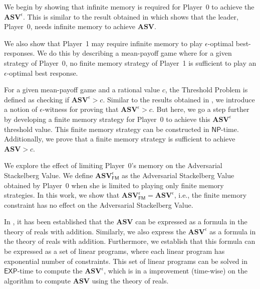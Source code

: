 
We begin by showing that infinite memory is required for Player~0 to achieve the $\mathbf{ASV}^{\epsilon}$. This is similar to the result obtained in \cite{FGR20} which shows that the leader, Player~0, needs infinite memory to achieve $\mathbf{ASV}$. 

We also show that Player~1 may require infinite memory to play $\epsilon$-optimal best-responses. We do this by describing a mean-payoff game where for a given strategy of Player~0, no finite memory strategy of Player~1 is sufficient to play an $\epsilon$-optimal best response.

For a given mean-payoff game and a rational value $c$, the Threshold Problem is defined as checking if $\mathbf{ASV}^{\epsilon} > c$. Similar to the results obtained in \cite{FGR20}, we introduce a notion of $\epsilon$-witness for proving that $\mathbf{ASV}^{\epsilon} > c$. But here, we go a step further by developing a finite memory strategy for Player~0 to achieve this $\mathbf{ASV}^{\epsilon}$ threshold value. This finite memory strategy can be constructed in $\mathsf{NP}$-time. Additionally, we prove that a finite memory strategy is sufficient to achieve $\mathbf{ASV} > c$. 

We explore the effect of limiting Player~0's memory on the Adversarial Stackelberg Value. We define $\mathbf{ASV}^{\epsilon}_{\mathsf{FM}}$ as the Adversarial Stackelberg Value obtained by Player~0 when she is limited to playing only finite memory strategies. In this work, we show that $\mathbf{ASV}^{\epsilon}_{\mathsf{FM}} = \mathbf{ASV}^{\epsilon}$, i.e., the finite memory constraint has no effect on the Adversarial Stackelberg Value.

In \cite{FGR20}, it has been established that the $\mathbf{ASV}$ can be expressed as a formula in the theory of reals with addition. Similarly, we also express the $\mathbf{ASV}^{\epsilon}$ as a formula in the theory of reals with addition. Furthermore, we establish that this formula can be expressed as a set of linear programs, where each linear program has exponential number of constraints. This set of linear programs can be solved in $\mathsf{EXP}$-time to compute the $\mathbf{ASV}^{\epsilon}$, which is in a improvement (time-wise) on the algorithm to compute $\mathbf{ASV}$ using the theory of reals.

